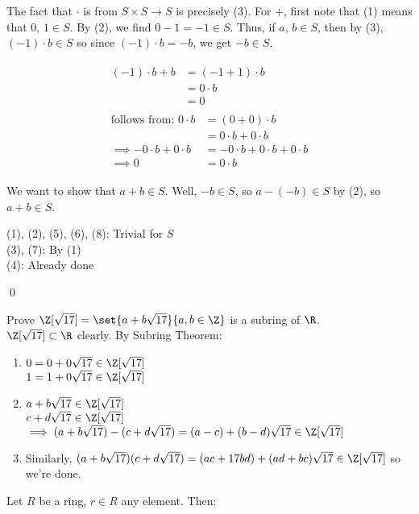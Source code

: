 The fact that $\cdot$ is from $S\times S\to S$ is precisely (3).  For $+$, first note that (1) means that $0$, $1\in S$.  By (2), we find $0-1=-1\in S$.  Thus, if $a$, $b\in S$, then by (3), $(-1)\cdot b\in S$ so since $(-1)\cdot b=-b$, we get $-b\in S$.
\begin{small}\begin{gather*}
\begin{aligned}
(-1)\cdot b + b &= (-1+1)\cdot b \\
&= 0\cdot b \\
&= 0
\end{aligned} \\
\begin{aligned}
\text{follows from: } 0\cdot b &= (0+0)\cdot b \\
&= 0\cdot b + 0\cdot b \\
\implies -0\cdot b + 0\cdot b &= -0\cdot b + 0\cdot b + 0\cdot b \\
\implies 0 &= 0\cdot b
\end{aligned}
\end{gather*}\end{small}%
We want to show that $a+b\in S$.  Well, $-b\in S$, so $a-(-b)\in S$ by (2), so $a+b\in S$. \\
\begin{small}(1), (2), (5), (6), (8): Trivial for $S$ \\
(3), (7): By (1) \\
(4): Already done\end{small}\qed

\eg Prove $\Z[\sqrt{17}]=\set{a+b\sqrt{17}}{a,b\in\Z}$ is a subring of $\R$. \\
\soln $\Z[\sqrt{17}]\subset\R$ clearly.  By Subring Theorem:
\begin{enumerate}[label=(\arabic*)]
\item $0=0+0\sqrt{17}\in\Z[\sqrt{17}]$ \\
$1=1+0\sqrt{17}\in\Z[\sqrt{17}]$
\item $a+b\sqrt{17}\in\Z[\sqrt{17}]$ \\
$c+d\sqrt{17}\in\Z[\sqrt{17}]$ \\
$\implies(a+b\sqrt{17})-(c+d\sqrt{17})=(a-c)+(b-d)\sqrt{17}\in\Z[\sqrt{17}]$
\item Similarly, $(a+b\sqrt{17})(c+d\sqrt{17})=(ac+17bd)+(ad+bc)\sqrt{17}\in\Z[\sqrt{17}]$ so we're done.
\end{enumerate}
 Let $R$ be a ring, $r\in R$ any element.  Then:

